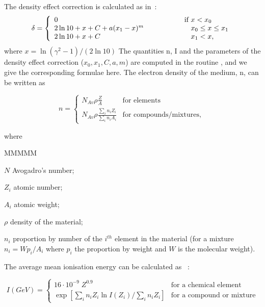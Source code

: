 The density effect correction is calculated as in~\cite{bib-STER}:
\begin{equation}
\delta = \left\{\begin{array}{l@{\hspace{2cm}}l}
0                          & \mbox{if } x<x_0                        \\
2\ln 10 + x+C+a(x_1-x)^m  & \mbox{\phantom{if }}x_0 \leq x\leq x_1  \\
2\ln 10 + x+C             & \mbox{\phantom{if }}x_1<x,
\end{array}\right .
\end{equation}
where $ x = \ln(\gamma^2-1) / (2\ln 10) $
 The quantities n, I and the parameters of the density effect correction
($x_0, x_1, C, a, m$) are computed in the routine ,
and we give the corresponding formulae here.
The electron density of the medium, n, can be written as

\begin{equation}
n = \left\{ \begin{array}{LL}

N_{Av} \rho \frac{Z}{A} & \mbox{for elements} \\ [.2cm]
N_{Av} \rho \frac{\sum_{i} n_i Z_i }{\sum_{i} n_i A_i} & 
\mbox{for compounds/mixtures, }
\end{array} \right .
\end{equation}

where

\begin{DLtt}{MMMMM}
\item [$N$]     Avogadro's number;
\item[$Z_i$]   atomic number;
\item[$A_i$]   atomic weight;
\item[$\rho$]    density of the material;
\item[$n_i$]     proportion by number of the $i^{th}$ element in the
        material (for a mixture 
       $n_i  = W p_i/A_i$
    where $p_i$ the proportion by weight and $W$ is the molecular
    weight).
\end{DLtt}

The average mean ionisation energy can be calculated as~\cite{bib-BERG}
\cite{bib-BETH} \cite{bib-BLOC} \cite{bib-EGS3}:

\begin{equation}
I (GeV) = \left\{ \begin{array}{LL}
16 \cdot 10^{-9} \; Z^{0.9} & \mbox{for a chemical element} \\
\exp \left [ \sum_{i} n_i Z_i \ln I(Z_i ) / \sum_i n_i Z _i \right ]
& \mbox{for a compound or mixture}
\end{array} \right .
\end{equation}
 
